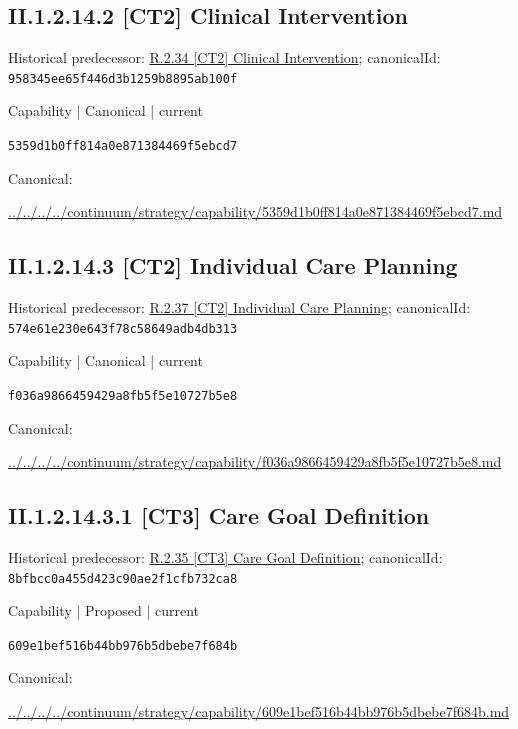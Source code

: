 \documentclass[10pt,a4paper]{article}
\begin{document}
\subsection*{II.1.2.14.2 [CT2] Clinical Intervention}
Historical predecessor: \hyperref[element-958345ee65f446d3b1259b8895ab100f]{R.2.34 [CT2] Clinical Intervention}; canonicalId: \texttt{958345ee65f446d3b1259b8895ab100f}\par
\label{element-5359d1b0ff814a0e871384469f5ebcd7}
{\small Capability | Canonical | current}\par
\texttt{5359d1b0ff814a0e871384469f5ebcd7}\par
Canonical: \par
{\footnotesize\url{../../../../continuum/strategy/capability/5359d1b0ff814a0e871384469f5ebcd7.md}}\par
\subsection*{II.1.2.14.3 [CT2] Individual Care Planning}
Historical predecessor: \hyperref[element-574e61e230e643f78c58649adb4db313]{R.2.37 [CT2] Individual Care Planning}; canonicalId: \texttt{574e61e230e643f78c58649adb4db313}\par
\label{element-f036a9866459429a8fb5f5e10727b5e8}
{\small Capability | Canonical | current}\par
\texttt{f036a9866459429a8fb5f5e10727b5e8}\par
Canonical: \par
{\footnotesize\url{../../../../continuum/strategy/capability/f036a9866459429a8fb5f5e10727b5e8.md}}\par
\subsection*{II.1.2.14.3.1 [CT3] Care Goal Definition}
Historical predecessor: \hyperref[element-8bfbcc0a455d423c90ae2f1cfb732ca8]{R.2.35 [CT3] Care Goal Definition}; canonicalId: \texttt{8bfbcc0a455d423c90ae2f1cfb732ca8}\par
\label{element-609e1bef516b44bb976b5dbebe7f684b}
{\small Capability | Proposed | current}\par
\texttt{609e1bef516b44bb976b5dbebe7f684b}\par
Canonical: \par
{\footnotesize\url{../../../../continuum/strategy/capability/609e1bef516b44bb976b5dbebe7f684b.md}}\par
\end{document}

